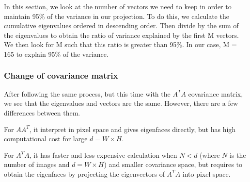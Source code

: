 In this section, we look at the number of vectors we need to keep in order to maintain 95\% of the variance in our projection. To do this, we calculate the cumulative eigenvalues ordered in descending order. Then divide by the sum of the eigenvalues to obtain the ratio of variance explained by the first M vectors. We then look for M such that this ratio is greater than 95\%. In our case, M = 165 to explain 95\% of the variance.

\subsubsection{Change of covariance matrix}

After following the same process, but this time with the $A^TA$ covariance matrix, we see that the eigenvalues and vectors are the same. However, there are a few differences between them.

For $AA^T$, it interpret in pixel space and gives eigenfaces directly, but has high computational cost for large \( d = W \times H \).

For $A^TA$, it has faster and less expensive calculation when \( N < d \) (where \( N \) is the number of images and \( d = W \times H \)) and smaller covariance space, but requires to obtain the eigenfaces by projecting the eigenvectors of $A^TA$ into pixel space.


